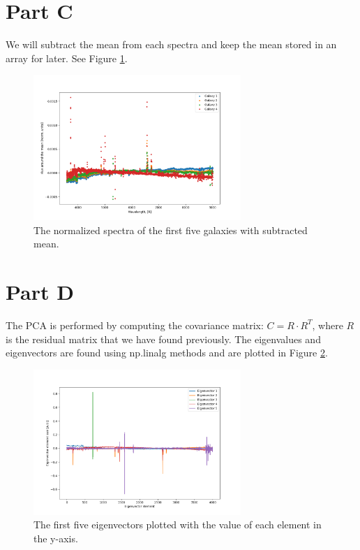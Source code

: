 \documentclass[11pt]{article}
\begin{document}
\section{Part C}
We will subtract the mean from each spectra and keep the mean stored in an array for later. See Figure \ref{mean}.
\begin{figure}[!htbp]
    \centering
    \includegraphics[width=0.7\textwidth]{Galaxies_norm_mean.png}
    \caption{The normalized spectra of the first five galaxies with subtracted mean.}
    \label{mean}
\end{figure}

\section{Part D}
The PCA is performed by computing the covariance matrix: $C=R \cdot  R^T$, where $R$ is the residual matrix that we have found previously. 
The eigenvalues and eigenvectors are found using np.linalg methods and are plotted in Figure \ref{eig}.
\begin{figure}[!htbp]
    \centering
    \includegraphics[width=0.7\textwidth]{eigen.png}
    \caption{The first five eigenvectors plotted with the value of each element in the y-axis. }
    \label{eig}
\end{figure}
\end{document}
